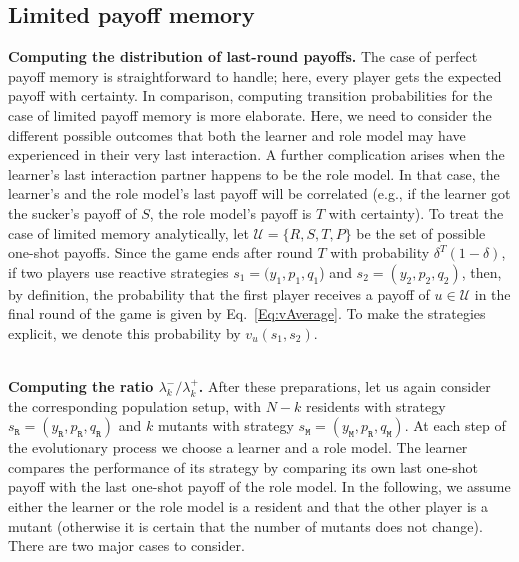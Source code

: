 \documentclass[11pt]{article}
\def\resident{\texttt{R}}
\def\mutant{\texttt{M}}
\def\strategy{s}
\theoremstyle{plainCl1}
\theoremstyle{plainCl2}
\begin{document}
\subsection{Limited payoff memory}\label{section:limited_memory}


{\bf Computing the distribution of last-round payoffs.}
The case of perfect payoff memory is straightforward to handle; here, every player gets the expected payoff with certainty. 
In comparison, computing transition probabilities for the case of limited payoff memory is more elaborate. 
Here, we need to consider the different possible outcomes that both the learner and role model may have experienced in their very last interaction. 
A further complication arises when the learner's last interaction partner happens to be the role model. 
In that case, the learner's and the role model's last payoff will be correlated (e.g., if the learner got the sucker's payoff of $S$, the role model's payoff is $T$ with certainty). 
To treat the case of limited memory analytically, let $\mathcal{U} \!=\! \{R,S,T,P\}$ be the set of possible one-shot payoffs. 
Since the game ends after round $T$ with probability $\delta^{T}\left(1-\delta\right)$, if two players use reactive strategies $\strategy_1\!=\!(y_1, p_1, q_1$)  and $\strategy_2\!=\!(y_2,p_2,q_2)$, then, by definition, the probability that the first player receives a payoff of $u\!\in\!\mathcal{U}$ in the final round of the game is given by Eq.~\eqref{Eq:vAverage}. To make the strategies explicit, we denote this probability by $v_{u}\!\left(\strategy_{1},\strategy_{2}\right)$.


~\\
\noindent
{\bf Computing the ratio $\lambda^-_k/\lambda^+_k$.}
After these preparations, let us again consider the corresponding population setup, with $N\!-\!k$ residents with strategy  \(\strategy_\resident = (y_\resident, p_\resident, q_\resident)\) and $k$ mutants with strategy  \(\strategy_\mutant = (y_\mutant, p_\resident, q_\mutant)\).
At each step of the evolutionary process we choose a learner and a role model. 
The learner compares the performance of its strategy by comparing its own last one-shot payoff with the last one-shot payoff of the role model. 
In the following, we assume either the learner or the role model is a resident and that the other player is a mutant (otherwise it is certain that the number of mutants does not change). 
There are two major cases to consider. 
\end{document}
